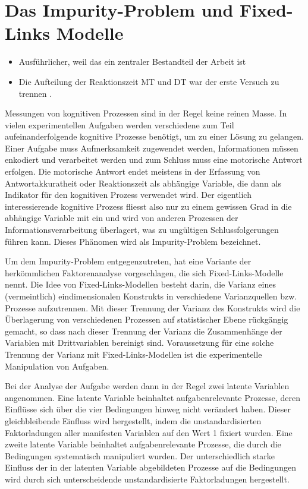 \documentclass[11pt, twoside, a4paper]{book}		%
\begin{document}
\clearpage
\section{Das Impurity-Problem und Fixed-Links Modelle}

\begin{itemize}
	\item Ausführlicher, weil das ein zentraler Bestandteil der Arbeit ist
	\item Die Aufteilung der Reaktionszeit MT und DT \citep{Deary2000} war der erste Versuch zu trennen \citep{Jensen1979}.
\end{itemize}

Messungen von kognitiven Prozessen sind in der Regel keine reinen Masse. In vielen experimentellen Aufgaben werden verschiedene zum Teil aufeinanderfolgende kognitive Prozesse benötigt, um zu einer Lösung zu gelangen. Einer Aufgabe muss Aufmerksamkeit zugewendet werden, Informationen müssen enkodiert und verarbeitet werden und zum Schluss muss eine motorische Antwort erfolgen. Die motorische Antwort endet meistens in der Erfassung von Antwortakkuratheit oder Reaktionszeit als abhängige Variable, die dann als Indikator für den kognitiven Prozess verwendet wird. Der eigentlich interessierende kognitive Prozess fliesst also nur zu einem gewissen Grad in die abhängige Variable mit ein und wird von anderen Prozessen der Informationsverarbeitung überlagert, was zu ungültigen Schlussfolgerungen führen kann. Dieses Phänomen wird als Impurity-Problem bezeichnet.

Um dem Impurity-Problem entgegenzutreten, hat \citet{Schweizer2006a, Schweizer2006b} eine Variante der herkömmlichen Faktorenanalyse vorgeschlagen, die sich Fixed-Links-Modelle nennt. Die Idee von Fixed-Links-Modellen besteht darin, die Varianz eines (vermeintlich) eindimensionalen Konstrukts in verschiedene Varianzquellen bzw. Prozesse aufzutrennen. Mit dieser Trennung der Varianz des Konstrukts wird die Überlagerung von verschiedenen Prozessen auf statistischer Ebene rückgängig gemacht, so dass nach dieser Trennung der Varianz die Zusammenhänge der Variablen mit Drittvariablen bereinigt sind. Voraussetzung für eine solche Trennung der Varianz mit Fixed-Links-Modellen ist die experimentelle Manipulation von Aufgaben. 


Bei der Analyse der Aufgabe werden dann in der Regel zwei latente Variablen angenommen. Eine latente Variable beinhaltet aufgabenrelevante Prozesse, deren Einflüsse sich über die vier Bedingungen hinweg nicht verändert haben. Dieser gleichbleibende Einfluss wird hergestellt, indem die unstandardisierten Faktorladungen aller manifesten Variablen auf den Wert 1 fixiert wurden. Eine zweite latente Variable beinhaltet aufgabenrelevante Prozesse, die durch die Bedingungen systematisch manipuliert wurden. Der unterschiedlich starke Einfluss der in der latenten Variable abgebildeten Prozesse auf die Bedingungen wird durch sich unterscheidende unstandardisierte Faktorladungen hergestellt.
\end{document}
